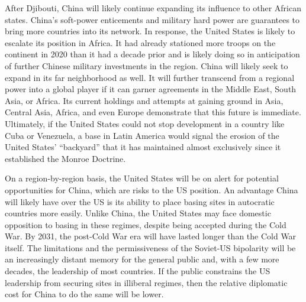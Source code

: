 After Djibouti, China will likely continue expanding its influence to other African states. China's soft-power enticements and military hard power are guarantees to bring more countries into its network. In response, the United States is likely to escalate its position in Africa. It had already stationed more troops on the continent in 2020 than it had a decade prior and is likely doing so in anticipation of further Chinese military investments in the region. China will likely seek to expand in its far neighborhood as well.\cite{OSD2020} It will further transcend from a regional power into a global player if it can garner agreements in the Middle East, South Asia, or Africa.\cite{yung2014,cabestan2020} Its current holdings and attempts at gaining ground in Asia, Central Asia, Africa, and even Europe demonstrate that this future is immediate.\cite{Doshi2021} Ultimately, if the United States could not stop development in a country like Cuba or Venezuela, a base in Latin America would signal the erosion of the United States' ``backyard'' that it has maintained almost exclusively since it established the Monroe Doctrine. 

On a region-by-region basis, the United States will be on alert for potential opportunities for China, which are risks to the US position. An advantage China will likely have over the US is its ability to place basing sites in autocratic countries more easily. Unlike China, the United States may face domestic opposition to basing in these regimes, despite being accepted during the Cold War. By 2031, the post-Cold War era will have lasted longer than the Cold War itself. The limitations and the permissiveness of the Soviet-US bipolarity will be an increasingly distant memory for the general public and, with a few more decades, the leadership of most countries. If the public constrains the US leadership from securing sites in illiberal regimes, then the relative diplomatic cost for China to do the same will be lower.


